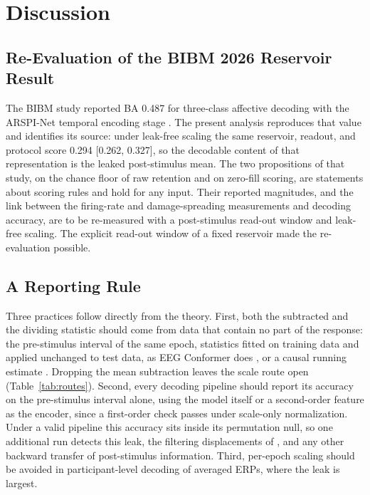 \section{Discussion}\label{sec:discussion}



\subsection{Re-Evaluation of the BIBM 2026 Reservoir Result}
The BIBM study reported BA 0.487 for three-class affective decoding with the ARSPI-Net temporal encoding stage \cite{lane2026bibm}. The present analysis reproduces that value and identifies its source: under leak-free scaling the same reservoir, readout, and protocol score 0.294 [0.262, 0.327], so the decodable content of that representation is the leaked post-stimulus mean. The two propositions of that study, on the chance floor of raw retention and on zero-fill scoring, are statements about scoring rules and hold for any input. Their reported magnitudes, and the link between the firing-rate and damage-spreading measurements and decoding accuracy, are to be re-measured with a post-stimulus read-out window and leak-free scaling. The explicit read-out window of a fixed reservoir made the re-evaluation possible.

\subsection{A Reporting Rule}
Three practices follow directly from the theory. First, both the subtracted and the dividing statistic should come from data that contain no part of the response: the pre-stimulus interval of the same epoch, statistics fitted on training data and applied unchanged to test data, as EEG Conformer does \cite{song2023conformer}, or a causal running estimate \cite{schirrmeister2017deep}. Dropping the mean subtraction leaves the scale route open (Table~\ref{tab:routes}). Second, every decoding pipeline should report its accuracy on the pre-stimulus interval alone, using the model itself or a second-order feature as the encoder, since a first-order check passes under scale-only normalization. Under a valid pipeline this accuracy sits inside its permutation null, so one additional run detects this leak, the filtering displacements of \cite{vandriel2021highpass}, and any other backward transfer of post-stimulus information. Third, per-epoch scaling should be avoided in participant-level decoding of averaged ERPs, where the leak is largest.

